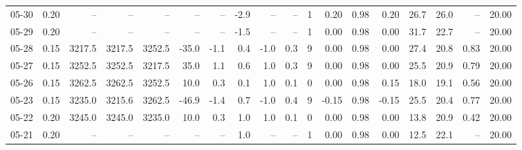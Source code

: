 \begin{threeparttable}
{\begin{tabular}{lrrrrrrrrrrrrrrrrr}
  05-30 &     0.20 &     -- &     -- &     -- &         -- &             -- &                      -2.9 &                       -- &                  -- &              1 &       0.20 &      0.98 &           0.20 &             26.7 &                26.0 &              -- &                  20.00 \\
  05-29 &     0.20 &     -- &     -- &     -- &         -- &             -- &                      -1.5 &                       -- &                  -- &              1 &       0.00 &      0.98 &           0.00 &             31.7 &                22.7 &              -- &                  20.00 \\
  05-28 &     0.15 & 3217.5 & 3217.5 & 3252.5 &      -35.0 &           -1.1 &                       0.4 &                     -1.0 &                 0.3 &              9 &       0.00 &      0.98 &           0.00 &             27.4 &                20.8 &            0.83 &                  20.00 \\
  05-27 &     0.15 & 3252.5 & 3252.5 & 3217.5 &       35.0 &            1.1 &                       0.6 &                      1.0 &                 0.3 &              9 &       0.00 &      0.98 &           0.00 &             25.5 &                20.9 &            0.79 &                  20.00 \\
  05-26 &     0.15 & 3262.5 & 3262.5 & 3252.5 &       10.0 &            0.3 &                       0.1 &                      1.0 &                 0.1 &              0 &       0.00 &      0.98 &           0.15 &             18.0 &                19.1 &            0.56 &                  20.00 \\
  05-23 &     0.15 & 3235.0 & 3215.6 & 3262.5 &      -46.9 &           -1.4 &                       0.7 &                     -1.0 &                 0.4 &              9 &      -0.15 &      0.98 &          -0.15 &             25.5 &                20.4 &            0.77 &                  20.00 \\
  05-22 &     0.20 & 3245.0 & 3245.0 & 3235.0 &       10.0 &            0.3 &                       1.0 &                      1.0 &                 0.1 &              0 &       0.00 &      0.98 &           0.00 &             13.8 &                20.9 &            0.42 &                  20.00 \\
  05-21 &     0.20 &     -- &     -- &     -- &         -- &             -- &                       1.0 &                       -- &                  -- &              1 &       0.00 &      0.98 &           0.00 &             12.5 &                22.1 &              -- &                  20.00 \\

\end{tabular}}
\end{threeparttable}
